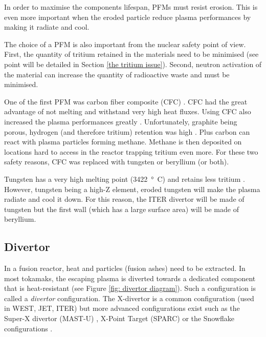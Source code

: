 In order to maximise the components lifespan, PFMs must resist erosion.
This is even more important when the eroded particle reduce plasma performances by making it radiate and cool.

The choice of a PFM is also important from the nuclear safety point of view.
First, the quantity of tritium retained in the materials need to be minimised (see point will be detailed in Section \ref{the tritium issue}).
Second, neutron activation of the material can increase the quantity of radioactive waste and must be minimised.

One of the first PFM was carbon fiber composite (CFC) .
CFC had the great advantage of not melting and withstand very high heat fluxes.
Using CFC also increased the plasma performances greatly .
Unfortunately, graphite being porous, hydrogen (and therefore tritium) retention was high .
Plus carbon can react with plasma particles forming methane.
Methane is then deposited on locations hard to access in the reactor trapping tritium even more.
For these two safety reasons, CFC was replaced with tungsten or beryllium (or both).

Tungsten has a very high melting point (\SI{3422}{°C}) and retains less tritium .
However, tungsten being a high-Z element, eroded tungsten will make the plasma radiate and cool it down.
For this reason, the ITER divertor will be made of tungsten but the first wall (which has a large surface area) will be made of beryllium.

\subsection{Divertor}

In a fusion reactor, heat and particles (fusion ashes) need to be extracted.
In most tokamaks, the escaping plasma is diverted towards a dedicated component that is heat-resistant (see Figure \ref{fig: divertor diagram}).
Such a configuration is called a \textit{divertor} configuration.
The X-divertor is a common configuration (used in WEST, JET, ITER) but more advanced configurations exist such as the Super-X divertor (MAST-U) , X-Point Target (SPARC)  or the Snowflake configurations .

